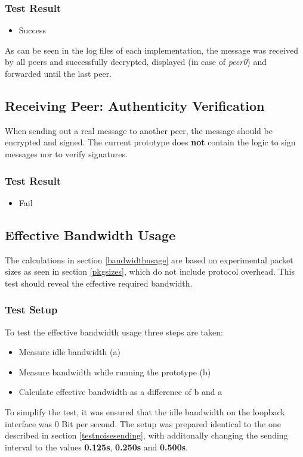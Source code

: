 \subsubsection{Test Result}
\begin{itemize}
\item Success
\end{itemize}
As can be seen in the log files of each implementation,
the message was received by all peers and successfully decrypted,
displayed (in case of \textit{peer0}) and forwarded until the last
peer.
\subsection{Receiving Peer: Authenticity Verification}
When sending out a real message to another peer, the message should be
encrypted and signed. 
The current prototype does \textbf{not} contain
the logic to sign messages nor to verify signatures.
\subsubsection{Test Result}
\begin{itemize}
\item Fail
\end{itemize}
\subsection{Effective Bandwidth Usage}
The calculations in section \ref{bandwidthusage} are based on experimental
packet sizes as seen in section \ref{pkgsizes}, which do not include
protocol overhead. This test should reveal the effective required
bandwidth.
\subsubsection{Test Setup}
To test the effective bandwidth usage three steps are taken:
\begin{itemize}
\item Measure idle bandwidth (a)
\item Measure bandwidth while running the prototype (b)
\item Calculate effective bandwidth as a difference of b and a
\end{itemize}
To simplify the test, it was ensured that the idle bandwidth on the
loopback interface was 0 Bit per second.
The setup was prepared identical to the one described
in section \ref{testnoisesending}, with additonally changing
the sending interval to the values \textbf{0.125s},
\textbf{0.250s} and \textbf{0.500s}.

